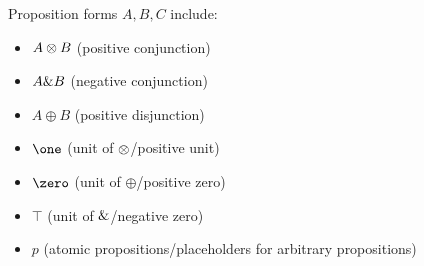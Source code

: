 \documentclass{article}
\begin{document}
Proposition forms $A,B,C$ include:
\begin{itemize}
  \item $A \otimes B$ (positive conjunction)
  \item $A \& B$ (negative conjunction)
  \item $A \oplus B$ (positive disjunction)
  \item $\one$ (unit of $\otimes$/positive unit)
  \item $\zero$ (unit of $\oplus$/positive zero)
  \item $\top$ (unit of $\&$/negative zero)
  \item $p$ (atomic propositions/placeholders for arbitrary propositions)
\end{itemize}




\end{document}
